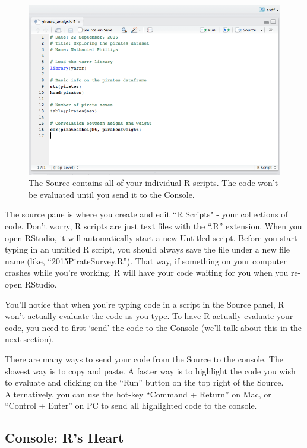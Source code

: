\documentclass[]{book}
\theoremstyle{definition}
\theoremstyle{definition}
\theoremstyle{remark}
\begin{document}
\begin{figure}

{\centering \includegraphics[width=1\linewidth]{images/piratesanalysisss} 

}

\caption{The Source contains all of your individual R scripts. The code won't be evaluated until you send it to the Console.}\label{fig:sourcewindow}
\end{figure}

The source pane is where you create and edit ``R Scripts" - your
collections of code. Don't worry, R scripts are just text files with the
``.R'' extension. When you open RStudio, it will automatically start a
new Untitled script. Before you start typing in an untitled R script,
you should always save the file under a new file name (like,
``2015PirateSurvey.R''). That way, if something on your computer crashes
while you're working, R will have your code waiting for you when you
re-open RStudio.

You'll notice that when you're typing code in a script in the Source
panel, R won't actually evaluate the code as you type. To have R
actually evaluate your code, you need to first `send' the code to the
Console (we'll talk about this in the next section).

There are many ways to send your code from the Source to the console.
The slowest way is to copy and paste. A faster way is to highlight the
code you wish to evaluate and clicking on the ``Run'' button on the top
right of the Source. Alternatively, you can use the hot-key ``Command +
Return'' on Mac, or ``Control + Enter'' on PC to send all highlighted
code to the console.

\subsection{Console: R's Heart}\label{console-rs-heart}
\end{document}
